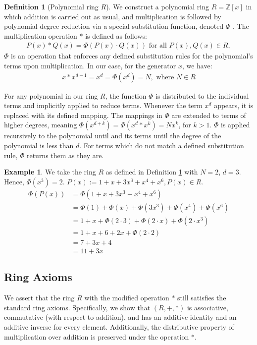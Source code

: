 \documentclass{article}
\theoremstyle{plain}
\theoremstyle{definition}
\newtheorem{definition}{Definition}
\newtheorem{example}{Example}
\begin{document}
\begin{definition}[Polynomial ring $R$] \label{definition:ring}
We construct a polynomial ring \(R = \mathbb{Z}[x]\) in which addition is carried out as usual, and multiplication is followed by polynomial degree reduction via a special substitution function, denoted $\Phi$ \cite{shunia2023polynomial}. The multiplication operation \(\ast\) is defined as follows:
\begin{align}
P(x) \ast Q(x) = \Phi(P(x) \cdot Q(x)) \text{ for all } P(x), Q(x) \in R,
\end{align}
\(\Phi\) is an operation that enforces any defined substitution rules for the polynomial's terms upon multiplication. In our case, for the generator \(x\), we have:
\begin{align}
x \ast x^{d-1} = x^d = \Phi(x^d) = N, \text{ where } N \in R
\end{align}

For any polynomial in our ring $R$, the function \( \Phi \) is distributed to the individual terms and implicitly applied to reduce terms. Whenever the term $x^d$ appears, it is replaced with its defined mapping. The mappings in $\Phi$ are extended to terms of higher degrees, meaning $\Phi(x^{d+k}) = \Phi(x^d \ast x^k) = N x^k$, for $k > 1$. $\Phi$ is applied recursively to the polynomial until and its terms until the degree of the polynomial is less than $d$. For terms which do not match a defined substitution rule, $\Phi$ returns them as they are.
\end{definition}

\begin{example}
We take the ring $R$ as defined in Definition \ref{definition:ring} with $N = 2$, $d = 3$. Hence, $\Phi(x^3) = 2$. $P(x) := 1 + x + 3x^3 + x^{4} + x^{6}, P(x) \in R$.
\begin{align}
    \Phi(P(x)) &= \Phi(1 + x + 3x^3 + x^{4} + x^{6}) \\
    &= \Phi(1) + \Phi(x) + \Phi(3x^3) + \Phi(x^{4}) + \Phi(x^{6}) \\
    &= 1 + x + \Phi(2 \cdot 3) + \Phi(2 \cdot x) + \Phi(2 \cdot x^3) \\
    &= 1 + x + 6 + 2x + \Phi(2 \cdot 2) \\
    &= 7 + 3x + 4 \\
    &= 11 + 3x
\end{align}
\end{example}

\subsection{Ring Axioms}
We assert that the ring \( R \) with the modified operation \(\ast\) still satisfies the standard ring axioms. Specifically, we show that \((R, +, \ast)\) is associative, commutative (with respect to addition), and has an additive identity and an additive inverse for every element. Additionally, the distributive property of multiplication over addition is preserved under the operation \(\ast\).
\end{document}
